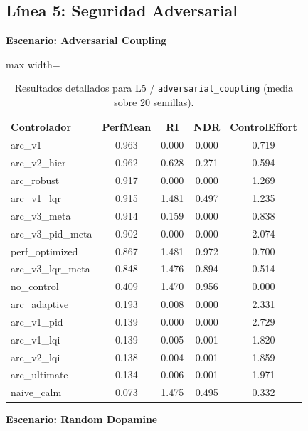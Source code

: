 \documentclass{article}
\newcommand{\scenarioheader}[1]{\Needspace{20\baselineskip}\textbf{Escenario: #1}}
\begin{document}
\FloatBarrier
\clearpage
\subsection{Línea 5: Seguridad Adversarial}

\scenarioheader{Adversarial Coupling}

\begin{table}[H]
\centering
\footnotesize
\caption{Resultados detallados para L5 / \texttt{adversarial\_coupling} (media sobre 20 semillas).}
\label{tab:g10_adversarial_coupling}
\begin{adjustbox}{max width=\textwidth}
\begin{tabular}{@{}lcccc@{}}
\toprule
Controlador & PerfMean & RI & NDR & ControlEffort \\ \midrule
arc\_v1 & 0.963 & 0.000 & 0.000 & 0.719 \\
arc\_v2\_hier & 0.962 & 0.628 & 0.271 & 0.594 \\
arc\_robust & 0.917 & 0.000 & 0.000 & 1.269 \\
arc\_v1\_lqr & 0.915 & 1.481 & 0.497 & 1.235 \\
arc\_v3\_meta & 0.914 & 0.159 & 0.000 & 0.838 \\
arc\_v3\_pid\_meta & 0.902 & 0.000 & 0.000 & 2.074 \\
perf\_optimized & 0.867 & 1.481 & 0.972 & 0.700 \\
arc\_v3\_lqr\_meta & 0.848 & 1.476 & 0.894 & 0.514 \\
no\_control & 0.409 & 1.470 & 0.956 & 0.000 \\
arc\_adaptive & 0.193 & 0.008 & 0.000 & 2.331 \\
arc\_v1\_pid & 0.139 & 0.000 & 0.000 & 2.729 \\
arc\_v1\_lqi & 0.139 & 0.005 & 0.001 & 1.820 \\
arc\_v2\_lqi & 0.138 & 0.004 & 0.001 & 1.859 \\
arc\_ultimate & 0.134 & 0.006 & 0.001 & 1.971 \\
naive\_calm & 0.073 & 1.475 & 0.495 & 0.332 \\ \bottomrule
\end{tabular}
\end{adjustbox}
\end{table}

\scenarioheader{Random Dopamine}
\end{document}

